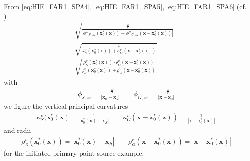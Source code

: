 \documentclass[a4paper,BCOR=15mm,10pt,twoside]{scrartcl}
\newcommand\wc{\frac{\omega}{c}}  %
\renewcommand{\vec}[1]{\mathbf{#1}}  %
\begin{document}
%
From \eqref{eq:HIE_FAR1_SPA4}, \eqref{eq:HIE_FAR1_SPA5}, \eqref{eq:HIE_FAR1_SPA6} (cf. \cite[(4.15-4.17)]{Firtha2018Diss})
\begin{align}
&\sqrt{\frac{\wc}{|\phi''_{S,zz}(\vec{x}_0^*(\vec{x}))+\phi''_{G,zz}(\vec{x}-\vec{x}_0^*(\vec{x}))|}}=\\ 
&\sqrt{\frac{1}{\kappa_S^v(\vec{x}_0^*(\vec{x}))+\kappa_G^v(\vec{x}-\vec{x}_0^*(\vec{x}))}}=\\
&\sqrt{\frac{\rho_S^v(\vec{x}_0^*(\vec{x}))\cdot\rho_G^v(\vec{x}-\vec{x}_0^*(\vec{x}))}{\rho_S^v(\vec{x}_0^*(\vec{x}))+\rho_G^v(\vec{x}-\vec{x}_0^*(\vec{x}))}} 
\end{align}
with
\begin{align}
\phi_{S,zz} = \frac{-\wc}{|\vec{x}_0-\vec{x}_S|}\qquad
\phi_{G,zz}  = \frac{-\wc}{|\vec{x}-\vec{x}_0|}
\end{align}
we figure the vertical principal curvatures
\begin{align}
\kappa_S^v(\vec{x}_0^*(\vec{x}) = \frac{1}{|\vec{x}_0^*(\vec{x})-\vec{x}_S|}\qquad
\kappa_G^v(\vec{x}-\vec{x}_0^*(\vec{x})) = \frac{1}{|\vec{x}-\vec{x}_0^*(\vec{x})|}
\end{align}
and radii
\begin{align}
\rho_S^v(\vec{x}_0^*(\vec{x})) = |\vec{x}_0^*(\vec{x})-\vec{x}_S|\qquad
\rho_G^v(\vec{x}-\vec{x}_0^*(\vec{x})) = |\vec{x}-\vec{x}_0^*(\vec{x})|
\end{align}
for the initiated primary point source example.
%
\end{document}
